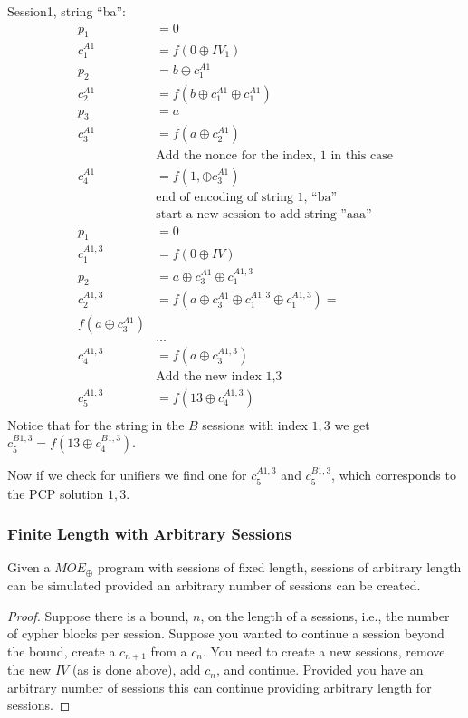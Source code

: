\documentclass{llncs}
\begin{document}
\begin{example}
Session1, string ``ba'':
\begin{align*}
p_1 &= 0\\
c^{A1}_1 &= f(0 \oplus IV_{1})\\
p_2 &= b \oplus c^{A1}_1\\
c^{A1}_2 &= f(b \oplus c^{A1}_1 \oplus c^{A1}_1)\\
p_3 &= a\\
c^{A1}_3 &= f(a \oplus c^{A1}_2)\\
&\text{Add the nonce for the index, 1 in this case}\\
c^{A1}_4 &=f(1, \oplus c^{A1}_3)\\
&\text{end of encoding of string 1, ``ba''}\\
&\text{start a new session to add string ''aaa''}\\
p_1 &= 0\\
c^{A1,3}_1 &= f(0 \oplus IV)\\
p_2 &= a \oplus c^{A1}_3 \oplus c^{A1,3}_1\\
c^{A1,3}_2 &= f(a \oplus c^{A1}_3 \oplus c^{A1,3}_1 \oplus c^{A1,3}_1 ) = \\ f(a \oplus c^{A1}_3) \\
&\ldots \\
c^{A1,3}_4 &= f(a \oplus c^{A1,3}_3) \\
&\text{Add the new index 1,3}\\
c^{A1,3}_5 &= f(13 \oplus c^{A1,3}_4) \\
\end{align*}
Notice that for the string in the $B$ sessions with index $1,3$ we get
$c^{B1,3}_5 = f(13 \oplus c^{B1,3}_4)$.

Now if we check for unifiers we find one for $c^{A1,3}_5$ and 
$c^{B1,3}_5$, which corresponds to the PCP solution $1,3$.
 
 
\end{example}


\subsubsection{Finite Length with Arbitrary Sessions}

\begin{lemma}\label{lemma:sim_arbitrary_length}
Given a $MOE_{\oplus}$ program with sessions of fixed length,
sessions of arbitrary length can be simulated provided 
an arbitrary number of sessions can be created. 	
\end{lemma}
\begin{proof}
Suppose there is a bound, $n$, on the length of a sessions, 
i.e., the number of cypher blocks per session. Suppose you wanted to continue a session beyond the bound, create a $c_{n+1}$ from 
a $c_{n}$. You need to create a new sessions, remove the 
new $IV$ (as is done above), add $c_{n}$, and continue. 
Provided you have an arbitrary number of sessions this can continue
providing arbitrary length for sessions. 
\end{proof}
\end{document}
